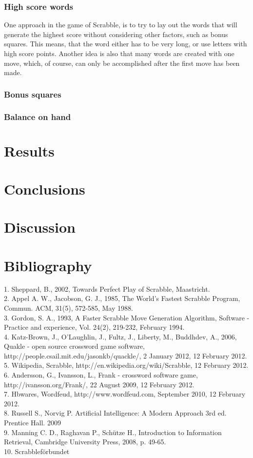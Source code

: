 \documentclass[a4paper, 12pt]{report}
\begin{document}
\subsection{High score words}
One approach in the game of Scrabble, is to try to lay out the words that will generate the highest score without considering other factors, such as bonus squares. This means, that the word either has to be very long, or use letters with high score points. Another idea is also that many words are created with one move, which, of course, can only be accomplished after the first move has been made.
\subsection{Bonus squares}
\subsection{Balance on hand}
\chapter{Results}
\chapter{Conclusions}
\chapter{Discussion}
\chapter{Bibliography}
1. Sheppard, B., 2002, Towards Perfect Play of Scrabble, Maastricht.\\
2. Appel A. W., Jacobson, G. J., 1985, The World’s Fastest Scrabble Program, Commun. ACM, 31(5), 572-585, May 1988.\\
3. Gordon, S. A., 1993, A Faster Scrabble Move Generation Algorithm, Software - Practice and experience, Vol. 24(2), 219-232, February 1994.\\
4.  Katz-Brown, J., O’Laughlin, J., Fultz, J., Liberty, M., Buddhdev, A., 2006, Quakle - open source crossword game software, \\ http://people.csail.mit.edu/jasonkb/quackle/, 2 January 2012,  12 February 2012.\\
5. Wikipedia, Scrabble, http://en.wikipedia.org/wiki/Scrabble, 12 February 2012.\\
6. Andersson, G., Ivansson, L., Frank - crossword software game, \\ http://ivansson.org/Frank/, 22 August 2009, 12 February 2012.\\
7. Hbwares, Wordfeud, http://www.wordfeud.com, September 2010, 12 February 2012.\\
8. Russell S., Norvig P. Artificial Intelligence: A Modern Approach 3rd ed. Prentice Hall. 2009\\
9. Manning C. D., Raghavan P., Schütze H., Introduction to Information Retrieval, Cambridge University Press, 2008, p. 49-65.\\
10. Scrabbleförbundet
\end{document}
